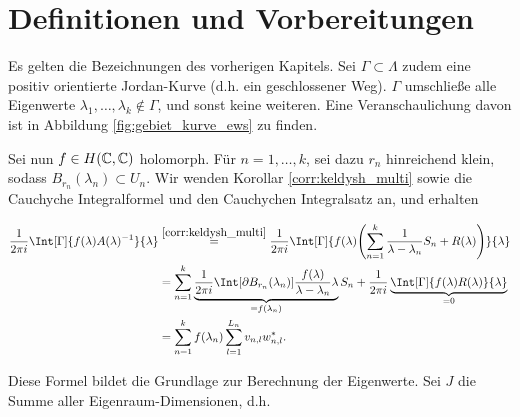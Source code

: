 \section{Definitionen und Vorbereitungen}

Es gelten die Bezeichnungen des vorherigen Kapitels.
Sei $\Gamma \subset \Lambda$ zudem eine positiv orientierte Jordan-Kurve (d.h. ein geschlossener Weg).
$\Gamma$ umschließe alle Eigenwerte $\lambda_1, \dots, \lambda_k \not \in \Gamma$, und sonst keine weiteren.
Eine Veranschaulichung davon ist in Abbildung \ref{fig:gebiet_kurve_ews} zu finden.



Sei nun $f \in H(\mathbb C, \mathbb C)$ holomorph.
Für $n = 1, \dots, k$, sei dazu $r_n$ hinreichend klein, sodass $B_{r_n}(\lambda_n) \subset U_n$.
Wir wenden Korollar \ref{corr:keldysh_multi} sowie die Cauchyche Integralformel und den Cauchychen Integralsatz an, und erhalten

\begin{align} \label{eq:cauchysche_integral_formel_satz}
    \begin{split}
        \frac{1}{2 \pi i}
        \Int[\Gamma]
        {
            f(\lambda) A(\lambda)^{-1}
        }{\lambda}
        & \stackrel
        {
            \ref{corr:keldysh_multi}
        }{=}
        \frac{1}{2 \pi i}
        \Int[\Gamma]
        {
            f(\lambda)
            \pbraces
            {
                \sum_{n=1}^k
                    \frac{1}{\lambda - \lambda_n} S_n
                    +
                    R(\lambda)
            }
        }{\lambda} \\
        & =
        \sum_{n=1}^k
            \underbrace
            {
                \frac{1}{2 \pi i}
                \Int[\partial B_{r_n}(\lambda_n)]
                {
                    \frac{f(\lambda)}{\lambda - \lambda_n}
                }{\lambda}
            }_{=f(\lambda_n)}
            S_n
        +
        \frac{1}{2 \pi i}
        \underbrace
        {
            \Int[\Gamma]
            {
                f(\lambda) R(\lambda)
            }{\lambda}
        }_{=0} \\
        & =
        \sum_{n=1}^k
            f(\lambda_n)
            \sum_{l=1}^{L_n}
                v_{n, l} w_{n, l}^\ast.
    \end{split}
\end{align}

Diese Formel bildet die Grundlage zur Berechnung der Eigenwerte.
Sei $J$ die Summe aller Eigenraum-Dimensionen, d.h.

